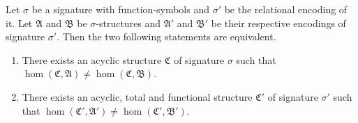 \begin{lemma}
	Let $\sigma$ be a signature with function-symbols and $\sigma'$ be the relational encoding of it.
	Let $\mathfrak A$ and $\mathfrak B$ be $\sigma$-structures and $\mathfrak A'$ and $\mathfrak B'$ be their respective encodings of signature $\sigma'$.
	Then the two following statements are equivalent.
	\begin{enumerate}
		\item There exists an acyclic structure $\mathfrak C$ of signature $\sigma$ such that $\hom(\mathfrak C,\mathfrak A)\neq\hom(\mathfrak C,\mathfrak B)$.
		\item There exists an acyclic, total and functional structure $\mathfrak C'$ of signature $\sigma'$ such that $\hom(\mathfrak C',\mathfrak A')\neq \hom(\mathfrak C',\mathfrak B')$.
	\end{enumerate}
\end{lemma}
